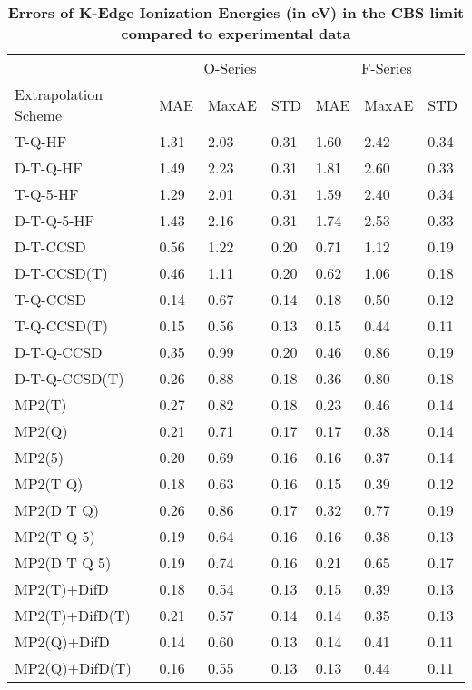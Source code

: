 \begin{table}
  \caption{\textbf{Errors of K-Edge Ionization Energies (in eV) in the CBS limit compared to experimental data}}
  \label{tbl:of-series-wide}
  \begin{tabular}{l l l l l l l }
    \hline
     & \multicolumn{3}{c}{O-Series} & \multicolumn{3}{c}{F-Series} \\ 
    Extrapolation Scheme & MAE & MaxAE & STD & MAE & MaxAE & STD \\ 
    \hline
    T-Q-HF & 1.31 & 2.03 & 0.31 & 1.60 & 2.42 & 0.34 \\ 
    D-T-Q-HF & 1.49 & 2.23 & 0.31 & 1.81 & 2.60 & 0.33 \\ 
    T-Q-5-HF & 1.29 & 2.01 & 0.31 & 1.59 & 2.40 & 0.34 \\ 
    D-T-Q-5-HF & 1.43 & 2.16 & 0.31 & 1.74 & 2.53 & 0.33 \\ 
    D-T-CCSD & 0.56 & 1.22 & 0.20 & 0.71 & 1.12 & 0.19 \\ 
    D-T-CCSD(T) & 0.46 & 1.11 & 0.20 & 0.62 & 1.06 & 0.18 \\ 
    T-Q-CCSD & 0.14 & 0.67 & 0.14 & 0.18 & 0.50 & 0.12 \\ 
    T-Q-CCSD(T) & 0.15 & 0.56 & 0.13 & 0.15 & 0.44 & 0.11 \\ 
    D-T-Q-CCSD & 0.35 & 0.99 & 0.20 & 0.46 & 0.86 & 0.19 \\ 
    D-T-Q-CCSD(T) & 0.26 & 0.88 & 0.18 & 0.36 & 0.80 & 0.18 \\ 
    MP2(T) & 0.27 & 0.82 & 0.18 & 0.23 & 0.46 & 0.14 \\ 
    MP2(Q) & 0.21 & 0.71 & 0.17 & 0.17 & 0.38 & 0.14 \\ 
    MP2(5) & 0.20 & 0.69 & 0.16 & 0.16 & 0.37 & 0.14 \\ 
    MP2(T Q) & 0.18 & 0.63 & 0.16 & 0.15 & 0.39 & 0.12 \\ 
    MP2(D T Q) & 0.26 & 0.86 & 0.17 & 0.32 & 0.77 & 0.19 \\ 
    MP2(T Q 5) & 0.19 & 0.64 & 0.16 & 0.16 & 0.38 & 0.13 \\ 
    MP2(D T Q 5) & 0.19 & 0.74 & 0.16 & 0.21 & 0.65 & 0.17 \\ 
    MP2(T)+DifD & 0.18 & 0.54 & 0.13 & 0.15 & 0.39 & 0.13 \\ 
    MP2(T)+DifD(T) & 0.21 & 0.57 & 0.14 & 0.14 & 0.35 & 0.13 \\ 
    MP2(Q)+DifD & 0.14 & 0.60 & 0.13 & 0.14 & 0.41 & 0.11 \\ 
    MP2(Q)+DifD(T) & 0.16 & 0.55 & 0.13 & 0.13 & 0.44 & 0.11 \\ 

\end{tabular}
\end{table}
